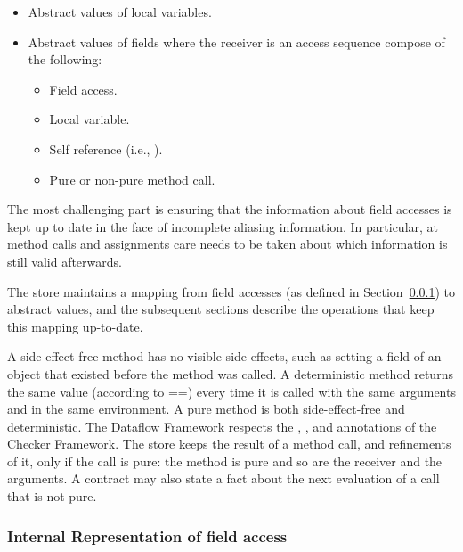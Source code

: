 \begin{itemize}
    \item Abstract values of local variables.
    \item Abstract values of fields where the receiver is an
          access sequence compose of the following:
    \begin{itemize}
    \item Field access.
    \item Local variable.
    \item Self reference (i.e., ).
    \item Pure or non-pure method call.
    \end{itemize}
\end{itemize}

The most challenging part is ensuring that the information about field
accesses is kept up to date in the face of incomplete aliasing
information.  In particular, at method calls and assignments care
needs to be taken about which information is still valid afterwards.

The store maintains a mapping from field accesses (as defined in
Section~\ref{sec:field-access}) to abstract values, and the subsequent
sections describe the operations that keep this mapping up-to-date.

A side-effect-free method has no visible side-effects, such
as setting a field of an object that existed before the method was called.
A deterministic method returns the same value (according to ==) every time
it is called with the same arguments and in the same environment.
A pure method is both side-effect-free and deterministic.
The Dataflow Framework respects the
\href{https://eisop.github.io/cf/api/org/checkerframework/dataflow/qual/SideEffectFree.html}{},
\href{https://eisop.github.io/cf/api/org/checkerframework/dataflow/qual/Deterministic.html}{}, and
\href{https://eisop.github.io/cf/api/org/checkerframework/dataflow/qual/Pure.html}{}
annotations of the Checker Framework.
The store keeps the result of a method call, and refinements of it, only if the call is pure: the method is pure and so are the receiver and the arguments.
A contract may also state a fact about the next evaluation of a call that is not pure.


\subsubsection{Internal Representation of field access}
\label{sec:field-access}

